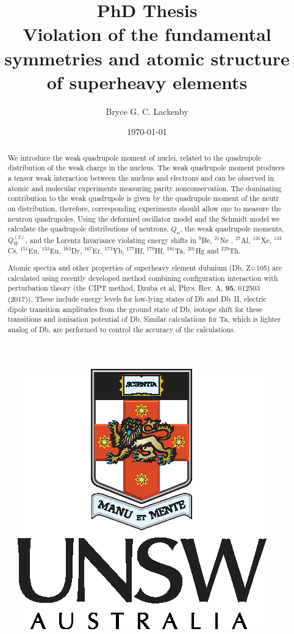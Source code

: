 \documentclass[10pt,a4paper, twoside]{report}
\begin{document}
\onehalfspacing
\title{PhD Thesis \\
Violation of the fundamental symmetries and atomic structure of superheavy elements}
\begin{figure}
\centering
\includegraphics[scale=1]{./figures/unsw-crest.eps}
\captionsetup[figure]{list=no}
\end{figure}
\author{Bryce G. C. Lackenby}
\date{\today}
\maketitle
\tableofcontents


\begin{abstract}
We introduce the weak quadrupole moment of nuclei, related to the quadrupole distribution of the weak charge in the nucleus.  The weak quadrupole moment produces a tensor weak interaction  between the nucleus and electrons and can be observed in atomic and molecular experiments measuring parity nonconservation. The dominating contribution to the weak quadrupole is given by the quadrupole moment of the neutr on distribution, therefore, corresponding experiments should allow one to measure the neutron quadrupoles. Using the deformed oscillator model and the Schmidt model we calculate the quadrupole distributions of neutrons, $Q_{n}$, the weak quadrupole moments, $Q_{W}^{(2)}$, and the Lorentz Invariance violating energy shifts in $^{9}$Be, $^{21}$Ne , $^{27}$Al, $^{131}$Xe, $^{133}$Cs, $^{151}$Eu, $^{153}$Eu, $^{163}$Dy, $^{167}$Er, $^{173}$Yb, $^{177}$Hf, $^{179}$Hf, $^{181}$Ta, $^{201}$Hg and $^{229}$Th. 

Atomic spectra and other properties of superheavy element dubnium (Db, Z=105) are calculated using
recently developed method combining configuration interaction with perturbation theory (the CIPT method,
Dzuba et al, Phys. Rev. A, {\bf 95}, 012503 (2017)). These include energy levels for low-lying states of Db and Db~II,
electric dipole transition amplitudes from the ground state of Db, isotope shift for these transitions and ionisation 
potential of Db. Similar calculations for Ta, which is lighter analog of Db, are performed to control the accuracy
of the calculations.
\end{abstract}
\end{document}
